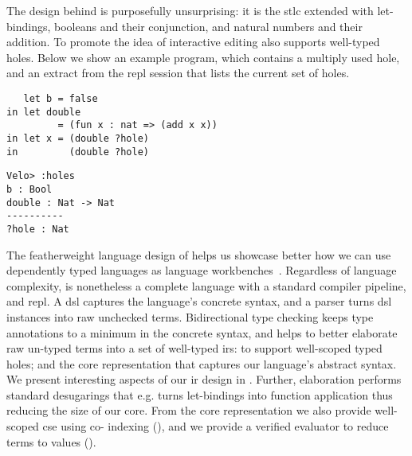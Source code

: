 The design behind \Velo{} is purposefully unsurprising:
%
it is the \ac{stlc} extended with let-bindings,
booleans and their conjunction,
and natural numbers and their addition.
%
To promote the idea of interactive editing \Velo{} also supports well-typed holes.
%
Below we show an example \Velo{} program, which contains a multiply used hole, and an extract from the \acs*{repl}
session that lists the current set of holes.

\begin{center}
  \begin{minipage}[t]{0.55\linewidth}
\begin{Verbatim}
   let b = false
in let double
         = (fun x : nat => (add x x))
in let x = (double ?hole)
in         (double ?hole)
\end{Verbatim}
\end{minipage}
\hfill
  \begin{minipage}[t]{0.35\linewidth}
    \begin{Verbatim}
Velo> :holes
b : Bool
double : Nat -> Nat
----------
?hole : Nat
\end{Verbatim}
\end{minipage}

\end{center}

The featherweight language design of \Velo{} helps us
showcase better how we can use dependently typed languages
as language workbenches~\cite{DBLP:journals/toplas/IgarashiPW01}.
%
Regardless of language complexity, \Velo{} is nonetheless a
complete language with a standard compiler pipeline, and \acs*{repl}.
%
A \ac{dsl} captures the language's concrete syntax, and a parser turns \ac{dsl} instances into raw unchecked terms.
%
Bidirectional type checking keeps type annotations to a minimum in the concrete syntax, and helps to better elaborate raw un-typed terms into a set of well-typed \acp{ir}:
%
 to support well-scoped typed holes;
%
and
%
 the core representation that captures our language's abstract syntax.
%
We present interesting aspects of our \ac{ir} design in .
%
Further, elaboration performs standard desugarings that e.g. turns let-bindings into function application thus reducing the size of our core.
%
From the core representation we also provide well-scoped \ac{cse} using co-\DeBruijn{} indexing (), and we provide a verified evaluator to reduce terms to values ().



